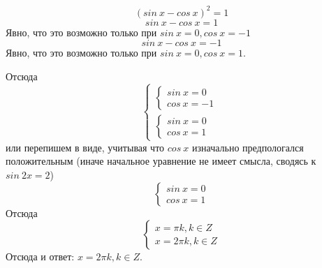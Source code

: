 \documentclass[a4paper]{article}
\begin{document}
$${(sin\ x-cos\ x)}^2=1$$
$$sin\ x-cos\ x=1$$
Явно, что это возможно только при $sin\ x=0, cos\ x=-1$
$$sin\ x-cos\ x=-1$$
Явно, что это возможно только при $sin\ x=0, cos\ x=1$.

Отсюда
\begin{equation}
\begin{cases}
	\begin{cases}
		sin\ x=0\\
		cos\ x=-1
	\end{cases}\\
	\begin{cases}
		sin\ x=0\\
		cos\ x=1
	\end{cases}	
\end{cases}	
\end{equation}
или перепишем в виде, учитывая что $cos\ x$ изначально предпологался положительным (иначе начальное уравнение не имеет смысла, сводясь к $sin\ 2x=2$)
\begin{equation}
\begin{cases}
		sin\ x=0\\
		cos\ x=1
\end{cases}	
\end{equation}
Отсюда
\begin{equation}
\begin{cases}
		x=\pi{k}, k\in{Z}\\
		x=2\pi{k}, k\in{Z}
\end{cases}	
\end{equation}
Отсюда и ответ: $x=2\pi{k}, k\in{Z}$.
\end{document}
